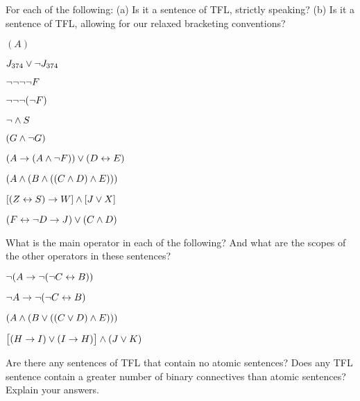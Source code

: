 \practiceproblems
\problempart
\label{pr.wiffTFL}
For each of the following: (a) Is it a sentence of TFL, strictly speaking? (b) Is it a sentence of TFL, allowing for our relaxed bracketing conventions?
\begin{earg}
\item $(A)$
\item $J_{374} \vee \neg J_{374}$
\item $\neg \neg \neg \neg F$
\item $\neg \neg \neg (\neg F)$
\item $\neg \wedge S$
\item $(G \wedge \neg G)$
\item $(A \rightarrow (A \wedge \neg F)) \vee (D \leftrightarrow E)$
\item $(A \wedge (B \wedge ((C \wedge D) \wedge E)))$
\item $[(Z \leftrightarrow S) \rightarrow W] \wedge [J \vee X]$
\item $(F \leftrightarrow \neg D \rightarrow J) \vee (C \wedge D)$
\end{earg}

\problempart
What is the main operator in each of the following?  And what are the scopes of the other operators in these sentences?

\begin{earg}
\item $\neg(A \rightarrow \neg (\neg C \leftrightarrow B))$
\item $\neg A \rightarrow \neg (\neg C \leftrightarrow B)$
\item $(A \wedge (B \vee ((C \vee D) \wedge E)))$
\item $\bigl[(H \rightarrow I) \vee (I \rightarrow H)\bigr] \wedge (J \vee K)$
\end{earg}

\problempart
Are there any sentences of TFL that contain no atomic sentences? Does any TFL sentence contain a greater number of binary connectives than atomic sentences?  Explain your answers.\\

